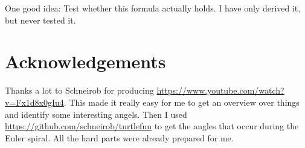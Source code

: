 \documentclass[pdftex,a4paper]{scrartcl}
\begin{document}
One good idea: Test whether this formula actually holds. I have only derived it, but never tested it.

\section{Acknowledgements}
Thanks a lot to Schneirob for producing \url{https://www.youtube.com/watch?v=Fx1d8x0gIu4}. This made it really easy for
me to get an overview over things and identify some interesting angels. Then I used
\url{https://github.com/schneirob/turtlefun} to get the angles that occur during the Euler spiral. All the hard parts
were already prepared for me.
\end{document}

